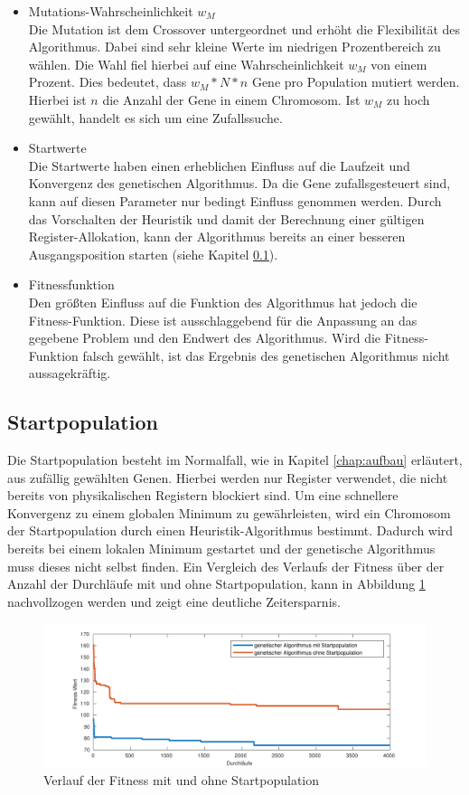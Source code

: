 \begin{itemize}
	\item Mutations-Wahrscheinlichkeit $w_M$\\
		Die Mutation ist dem Crossover untergeordnet und erhöht die Flexibilität des Algorithmus. Dabei sind sehr kleine Werte im niedrigen Prozentbereich zu wählen. Die Wahl fiel hierbei auf eine Wahrscheinlichkeit $w_M$ von einem Prozent. Dies bedeutet, dass $w_M * N * n$ Gene pro Population mutiert werden. Hierbei ist $n$ die Anzahl der Gene in einem Chromosom. Ist $w_M$ zu hoch gewählt, handelt es sich um eine Zufallssuche.
		
	\item Startwerte\\
		Die Startwerte haben einen erheblichen Einfluss auf die Laufzeit und Konvergenz des genetischen Algorithmus. Da die Gene zufallsgesteuert sind, kann auf diesen Parameter nur bedingt Einfluss genommen werden. Durch das Vorschalten der Heuristik und damit der Berechnung einer gültigen Register-Allokation, kann der Algorithmus bereits an einer besseren Ausgangsposition starten (siehe Kapitel \ref{sub:startpop}).
	\item Fitnessfunktion\\
		Den größten Einfluss auf die Funktion des Algorithmus hat jedoch die Fitness-Funktion. Diese ist ausschlaggebend für die Anpassung an das gegebene Problem und den Endwert des Algorithmus. Wird die Fitness-Funktion falsch gewählt, ist das Ergebnis des genetischen Algorithmus nicht aussagekräftig. 
\end{itemize}
 
\subsection{Startpopulation}
\label{sub:startpop}
Die Startpopulation besteht im Normalfall, wie in Kapitel \ref{chap:aufbau} erläutert, aus zufällig gewählten Genen. Hierbei werden nur Register verwendet, die nicht bereits von physikalischen Registern blockiert sind.
Um eine schnellere Konvergenz zu einem globalen Minimum zu gewährleisten, wird ein Chromosom der Startpopulation durch einen Heuristik-Algorithmus bestimmt. Dadurch wird bereits bei einem lokalen Minimum gestartet und der genetische Algorithmus muss dieses nicht selbst finden. Ein Vergleich des Verlaufs der Fitness über der Anzahl der Durchläufe mit und ohne Startpopulation, kann in Abbildung \ref{fig:startpop} nachvollzogen werden und zeigt eine deutliche Zeitersparnis.

\begin{figure}[H]
	\centering
	\includegraphics[width=\textwidth]{fig/startpop.pdf}
	\caption{Verlauf der Fitness mit und ohne Startpopulation}
	\label{fig:startpop}
\end{figure}

